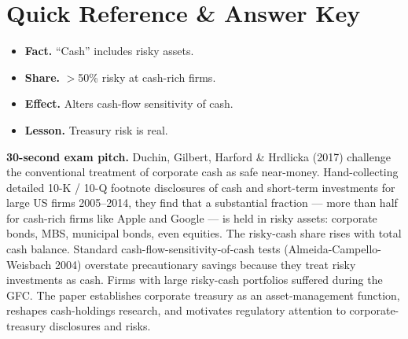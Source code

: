 \documentclass[11pt]{article}
\begin{document}
\section*{Quick Reference \& Answer Key}
\begin{answerbox}
\begin{itemize}
\item \textbf{Fact.} ``Cash'' includes risky assets.
\item \textbf{Share.} $>$50\% risky at cash-rich firms.
\item \textbf{Effect.} Alters cash-flow sensitivity of cash.
\item \textbf{Lesson.} Treasury risk is real.
\end{itemize}
\end{answerbox}

\begin{keybox}
\textbf{30-second exam pitch.} Duchin, Gilbert, Harford \& Hrdlicka (2017) challenge the conventional treatment of corporate cash as safe near-money. Hand-collecting detailed 10-K / 10-Q footnote disclosures of cash and short-term investments for large US firms 2005--2014, they find that a substantial fraction --- more than half for cash-rich firms like Apple and Google --- is held in risky assets: corporate bonds, MBS, municipal bonds, even equities. The risky-cash share rises with total cash balance. Standard cash-flow-sensitivity-of-cash tests (Almeida-Campello-Weisbach 2004) overstate precautionary savings because they treat risky investments as cash. Firms with large risky-cash portfolios suffered during the GFC. The paper establishes corporate treasury as an asset-management function, reshapes cash-holdings research, and motivates regulatory attention to corporate-treasury disclosures and risks.
\end{keybox}
\end{document}
